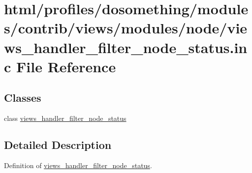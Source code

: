 \hypertarget{views__handler__filter__node__status_8inc}{
\section{html/profiles/dosomething/modules/contrib/views/modules/node/views\_\-handler\_\-filter\_\-node\_\-status.inc File Reference}
\label{views__handler__filter__node__status_8inc}
}
\subsection*{Classes}
\begin{DoxyCompactItemize}
\item 
class \hyperlink{classviews__handler__filter__node__status}{views\_\-handler\_\-filter\_\-node\_\-status}
\end{DoxyCompactItemize}


\subsection{Detailed Description}
Definition of \hyperlink{classviews__handler__filter__node__status}{views\_\-handler\_\-filter\_\-node\_\-status}. 